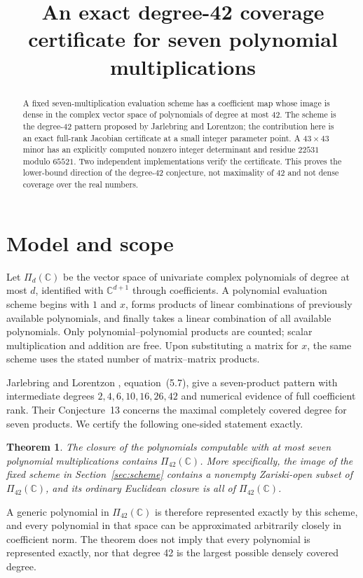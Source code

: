 \documentclass[11pt]{article}
\title{An exact degree-42 coverage certificate for seven polynomial multiplications}
\author{}
\date{}
\newtheorem{theorem}{Theorem}
\newcommand{\C}{\mathbb C}
\begin{document}
\maketitle
\begin{abstract}
A fixed seven-multiplication evaluation scheme has a coefficient map whose image is dense in the complex vector space of polynomials of degree at most 42. The scheme is the degree-42 pattern proposed by Jarlebring and Lorentzon; the contribution here is an exact full-rank Jacobian certificate at a small integer parameter point. A $43\times43$ minor has an explicitly computed nonzero integer determinant and residue $22531$ modulo $65521$. Two independent implementations verify the certificate. This proves the lower-bound direction of the degree-42 conjecture, not maximality of 42 and not dense coverage over the real numbers.
\end{abstract}

\section{Model and scope}
Let $\Pi_d(\C)$ be the vector space of univariate complex polynomials of degree at most $d$, identified with $\C^{d+1}$ through coefficients. A polynomial evaluation scheme begins with $1$ and $x$, forms products of linear combinations of previously available polynomials, and finally takes a linear combination of all available polynomials. Only polynomial--polynomial products are counted; scalar multiplication and addition are free. Upon substituting a matrix for $x$, the same scheme uses the stated number of matrix--matrix products.

Jarlebring and Lorentzon \cite{JL}, equation~(5.7), give a seven-product pattern with intermediate degrees $2,4,6,10,16,26,42$ and numerical evidence of full coefficient rank. Their Conjecture~13 concerns the maximal completely covered degree for seven products. We certify the following one-sided statement exactly.

\begin{theorem}\label{thm:coverage}
The closure of the polynomials computable with at most seven polynomial multiplications contains $\Pi_{42}(\C)$. More specifically, the image of the fixed scheme in Section~\ref{sec:scheme} contains a nonempty Zariski-open subset of $\Pi_{42}(\C)$, and its ordinary Euclidean closure is all of $\Pi_{42}(\C)$.
\end{theorem}

A generic polynomial in $\Pi_{42}(\C)$ is therefore represented exactly by this scheme, and every polynomial in that space can be approximated arbitrarily closely in coefficient norm. The theorem does not imply that every polynomial is represented exactly, nor that degree 42 is the largest possible densely covered degree.
\end{document}
